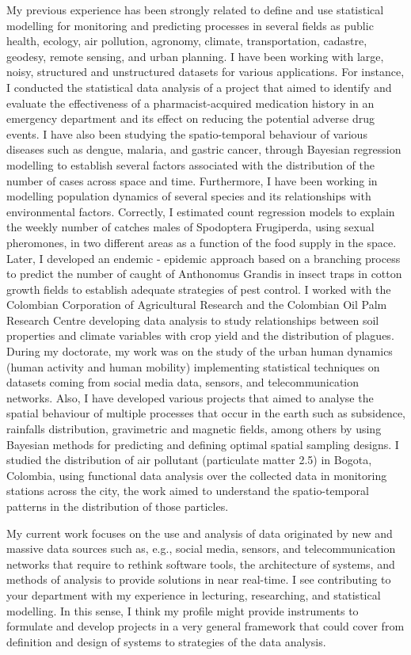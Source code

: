 \documentclass[11pt, a4paper]{awesome-cv}
\begin{document}
\begin{cvletter}
My previous experience has been strongly related to define and use statistical modelling for monitoring and predicting processes in several fields as public health, ecology, air pollution, agronomy, climate, transportation, cadastre, geodesy, remote sensing, and urban planning. I have been working with large, noisy, structured and unstructured datasets for various applications. For instance, I conducted the statistical data analysis of a project that aimed to identify and evaluate the effectiveness of a pharmacist-acquired medication history in an emergency department and its effect on reducing the potential adverse drug events. I have also been studying the spatio-temporal behaviour of various diseases such as dengue, malaria, and gastric cancer, through Bayesian regression modelling to establish several factors associated with the distribution of the number of cases across space and time. Furthermore, I have been working in modelling population dynamics of several species and its relationships with environmental factors. Correctly, I estimated count regression models to explain the weekly number of catches males of Spodoptera Frugiperda, using sexual pheromones, in two different areas as a function of the food supply in the space. Later, I developed an endemic - epidemic approach based on a branching process to predict the number of caught of Anthonomus Grandis in insect traps in cotton growth fields to establish adequate strategies of pest control. I worked with the Colombian Corporation of Agricultural Research and the Colombian Oil Palm Research Centre developing data analysis to study relationships between soil properties and climate variables with crop yield and the distribution of plagues. During my doctorate, my work was on the study of the urban human dynamics (human activity and human mobility) implementing statistical techniques on datasets coming from social media data, sensors, and telecommunication networks. Also, I have developed various projects that aimed to analyse the spatial behaviour of multiple processes that occur in the earth such as subsidence, rainfalls distribution, gravimetric and magnetic fields, among others by using Bayesian methods for predicting and defining optimal spatial sampling designs. I studied the distribution of air pollutant (particulate matter 2.5) in Bogota, Colombia, using functional data analysis over the collected data in monitoring stations across the city, the work aimed to understand the spatio-temporal patterns in the distribution of those particles.\par
My current work focuses on the use and analysis of data originated by new and massive data sources such as, e.g., social media, sensors, and telecommunication networks that require to rethink software tools, the architecture of systems, and methods of analysis to provide solutions in near real-time. I see contributing to your department with my experience in lecturing, researching, and statistical modelling. In this sense, I think my profile might provide instruments to formulate and develop projects in a very general framework that could cover from definition and design of systems to strategies of the data analysis.\par

\end{cvletter}
\end{document}
